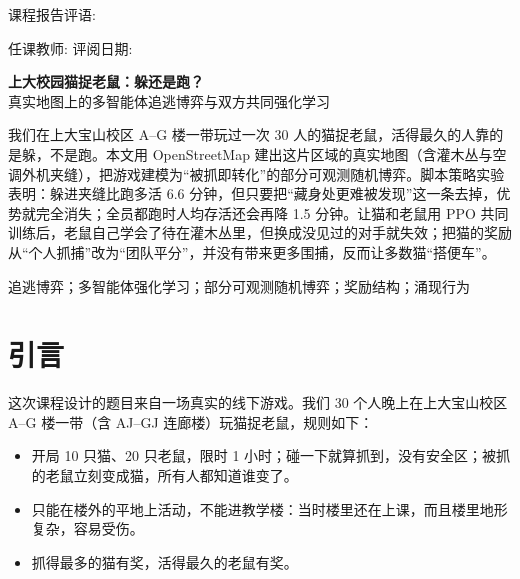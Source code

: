 \documentclass[a4paper,zihao=5,fontset=fandol,UTF8]{ctexart}
\begin{document}
\vspace{6pt}
{\fontsize{12pt}{16pt}\selectfont\heiti 课程报告评语:}

\vfill
{\fontsize{12pt}{16pt}\selectfont\heiti 任课教师: \underline{\makebox[3cm]{}}\hfill 评阅日期: \underline{\makebox[2.6cm]{}}}
\vspace{1.5cm}
\newpage

\begin{center}
{\fontsize{22pt}{30pt}\selectfont\bfseries\heiti 上大校园猫捉老鼠：躲还是跑？}\\[6pt]
{\fontsize{12pt}{16pt}\selectfont\heiti 真实地图上的多智能体追逃博弈与双方共同强化学习}
\end{center}
\vspace{4pt}

%
我们在上大宝山校区 A–G 楼一带玩过一次 30 人的猫捉老鼠，活得最久的人靠的是躲，不是跑。本文用 OpenStreetMap 建出这片区域的真实地图（含灌木丛与空调外机夹缝），把游戏建模为“被抓即转化”的部分可观测随机博弈。脚本策略实验表明：躲进夹缝比跑多活 6.6 分钟，但只要把“藏身处更难被发现”这一条去掉，优势就完全消失；全员都跑时人均存活还会再降 1.5 分钟。让猫和老鼠用 PPO 共同训练后，老鼠自己学会了待在灌木丛里，但换成没见过的对手就失效；把猫的奖励从“个人抓捕”改为“团队平分”，并没有带来更多围捕，反而让多数猫“搭便车”。

\vspace{4pt}
追逃博弈；多智能体强化学习；部分可观测随机博弈；奖励结构；涌现行为

\vspace{8pt}

\section{引言}
这次课程设计的题目来自一场真实的线下游戏。我们 30 个人晚上在上大宝山校区 A–G 楼一带（含 AJ–GJ 连廊楼）玩猫捉老鼠，规则如下：
\begin{itemize}
  \item 开局 10 只猫、20 只老鼠，限时 1 小时；碰一下就算抓到，没有安全区；被抓的老鼠立刻变成猫，所有人都知道谁变了。
  \item 只能在楼外的平地上活动，不能进教学楼：当时楼里还在上课，而且楼里地形复杂，容易受伤。
  \item 抓得最多的猫有奖，活得最久的老鼠有奖。
\end{itemize}
\end{document}
